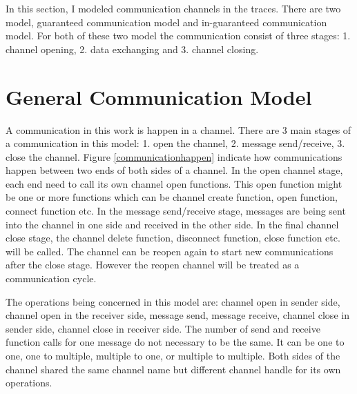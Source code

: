 \label{chapter:Mod}
In this section, I modeled communication channels in the traces. There are two model, guaranteed communication model and in-guaranteed communication model. For both of these two model the communication consist of three stages: 1. channel opening, 2. data exchanging and 3. channel closing.

\section{General Communication Model}   
A communication in this work is happen in a channel. There are 3 main stages of a communication in this model: 1. open the channel, 2. message send/receive, 3. close the channel. Figure \ref{communicationhappen} indicate how communications happen between two ends of both sides of a channel. In the open channel stage, each end need to call its own channel open functions. This open function might be one or more functions which can be channel create function, open function, connect function etc.  In the message send/receive stage, messages are being sent into the channel in one side and received in the other side. In the final channel close stage, the channel delete function, disconnect function, close function etc. will be called. The channel can be reopen again to start new communications after the close stage. However the reopen channel will be treated as a communication cycle.

The operations being concerned in this model are: channel open in sender side, channel open in the receiver side, message send, message receive, channel close in sender side, channel close in receiver side. The number of send and receive function calls for one message do not necessary to be the same. It can be one to one, one to multiple, multiple to one, or multiple to multiple. Both sides of the channel shared the same channel name but different channel handle for its own operations.

